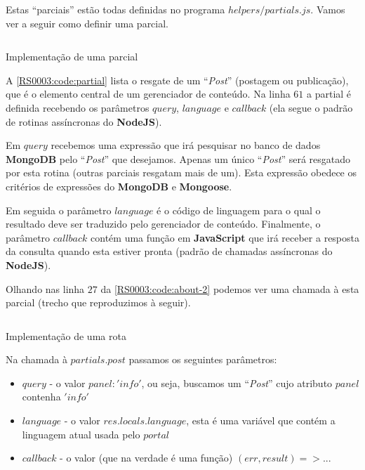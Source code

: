 Estas ``parciais'' estão todas definidas no programa $helpers / partials.js$. Vamos ver a seguir como definir uma parcial.

\begin{code}
    \inputminted[label=partials.js,firstline=60,lastline=71]{JavaScript}{../RS0003/anexos/partials.js}
    \caption{Implementação de uma parcial}\label{RS0003:code:partial}
\end{code}

A \cref{RS0003:code:partial} lista o resgate de um ``\textit{Post}'' (postagem ou publicação), que é o elemento central de um gerenciador de conteúdo. Na linha $61$ a partial é definida recebendo os parâmetros $query$, $language$ e $callback$ (ela segue o padrão de rotinas assíncronas do \textbf{NodeJS}).

Em $query$ recebemos uma expressão que irá pesquisar no banco de dados \textbf{MongoDB} pelo ``\textit{Post}'' que desejamos. Apenas um único ``\textit{Post}'' será resgatado por esta rotina (outras parciais resgatam mais de um). Esta expressão obedece os critérios de expressões do \textbf{MongoDB} e \textbf{Mongoose}.

Em seguida o parâmetro $language$ é o código de linguagem para o qual o resultado deve ser traduzido pelo gerenciador de conteúdo. Finalmente, o parâmetro $callback$ contém uma função em \textbf{JavaScript} que irá receber a resposta da consulta quando esta estiver pronta (padrão de chamadas assíncronas do \textbf{NodeJS}).

Olhando nas linha $27$ da \cref{RS0003:code:about-2} podemos ver uma chamada à esta parcial (trecho que reproduzimos à seguir).

\begin{code}
    \inputminted[label=about.js,firstline=25,lastline=32]{JavaScript}{../RS0003/anexos/about.js}
    \caption{Implementação de uma rota}\label{RS0003:code:about-4}
\end{code}

Na chamada à $partials.post$ passamos os seguintes parâmetros:

\begin{itemize}
    \item $query$ - o valor ${ panel: 'info' }$, ou seja, buscamos um ``\textit{Post}'' cujo atributo $panel$ contenha $'info'$
    \item $language$ - o valor $res.locals.language$, esta é uma variável que contém a linguagem atual usada pelo $portal$
    \item $callback$ - o valor (que na verdade é uma função) $(err, result) => { . . .}$
\end{itemize}

